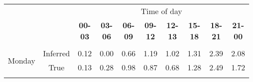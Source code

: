 \begin{table}[H]
\centering
\begin{tabular}{lccccccccc}
\cline{3-10}
                                                & \multicolumn{1}{c|}{}         & \multicolumn{8}{c|}{Time of day}                                                                                                                                                                                                                                                                              \\ \cline{3-10} 
                                                & \multicolumn{1}{c|}{}         & \multicolumn{1}{c|}{\textbf{00-03}} & \multicolumn{1}{c|}{\textbf{03-06}} & \multicolumn{1}{c|}{\textbf{06-09}} & \multicolumn{1}{c|}{\textbf{09-12}} & \multicolumn{1}{c|}{\textbf{12-13}} & \multicolumn{1}{c|}{\textbf{15-18}} & \multicolumn{1}{c|}{\textbf{18-21}} & \multicolumn{1}{c|}{\textbf{21-00}} \\ \cline{3-10} 
                                                &                               &                                     &                                     &                                     &                                     &                                     &                                     &                                     &                                     \\ \cline{2-10} 
\multicolumn{1}{l|}{\multirow{2}{*}{Monday}}    & \multicolumn{1}{c|}{Inferred} & \multicolumn{1}{c|}{0.12}           & \multicolumn{1}{c|}{0.00}           & \multicolumn{1}{c|}{0.66}           & \multicolumn{1}{c|}{1.19}           & \multicolumn{1}{c|}{1.02}           & \multicolumn{1}{c|}{1.31}           & \multicolumn{1}{c|}{2.39}           & \multicolumn{1}{c|}{2.08}           \\ \cline{2-10} 
\multicolumn{1}{l|}{}                           & \multicolumn{1}{c|}{True}     & \multicolumn{1}{c|}{0.13}           & \multicolumn{1}{c|}{0.28}           & \multicolumn{1}{c|}{0.98}           & \multicolumn{1}{c|}{0.87}           & \multicolumn{1}{c|}{0.68}           & \multicolumn{1}{c|}{1.28}           & \multicolumn{1}{c|}{2.49}           & \multicolumn{1}{c|}{1.72}           \\ \cline{2-10} 
                                                &                               &                                     &                                     &                                     &                                     &                                     &                                     &                                     &                                     \\ \cline{2-10} 

\end{tabular}
\end{table}
